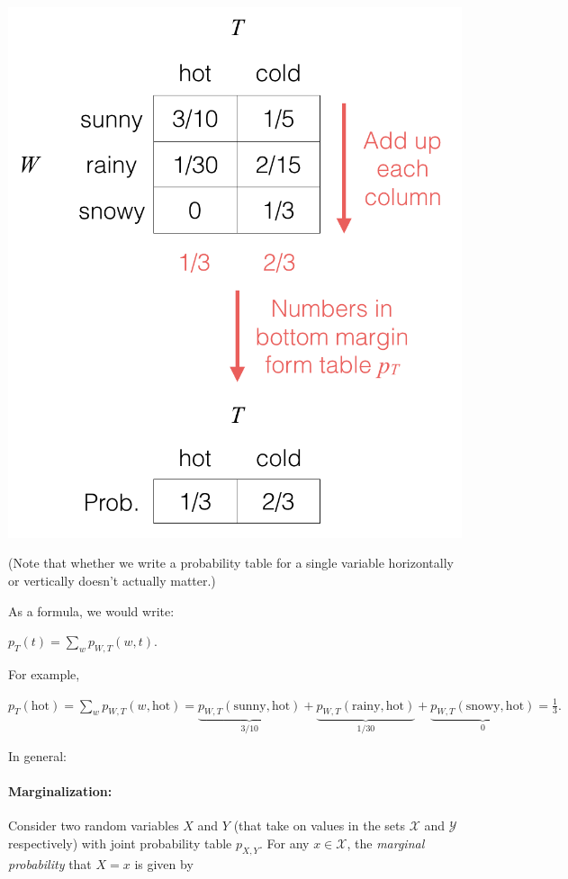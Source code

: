 \documentclass[6008notes.tex]{subfiles}
\begin{document}
{\centering\includegraphics[scale=0.4]{images_sec-joint-rv-marg-cols} \par}

(Note that whether we write a probability table for a single variable horizontally or vertically doesn't actually matter.)

As a formula, we would write:

{\centering$p_{T}(t)=\sum _{w}p_{W,T}(w,t).$ \par}
 
For example,

{\centering$p_{T}(\text {hot})=\sum _{w}p_{W,T}(w,\text {hot})=\underbrace{p_{W,T}(\text {sunny},\text {hot})}_{3/10}+\underbrace{p_{W,T}(\text {rainy},\text {hot})}_{1/30}+\underbrace{p_{W,T}(\text {snowy},\text {hot})}_{0}=\frac{1}{3}.$ \par}
 
In general:

\paragraph{Marginalization:} Consider two random variables $X$ and $Y$ (that take on values in the sets $\mathcal{X}$ and $\mathcal{Y}$ respectively) with joint probability table $p_{X,Y}$. For any $x\in \mathcal{X}$, the \textit{marginal probability} that $X=x$ is given by
\end{document}
